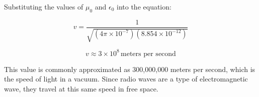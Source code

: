 Substituting the values of \( \mu_0 \) and \( \epsilon_0 \) into the equation:

\[
v = \frac{1}{\sqrt{(4\pi \times 10^{-7}) (8.854 \times 10^{-12})}}
\]

\[
v \approx 3 \times 10^8 \, \text{meters per second}
\]

This value is commonly approximated as 300,000,000 meters per second, which is the speed of light in a vacuum. Since radio waves are a type of electromagnetic wave, they travel at this same speed in free space.

